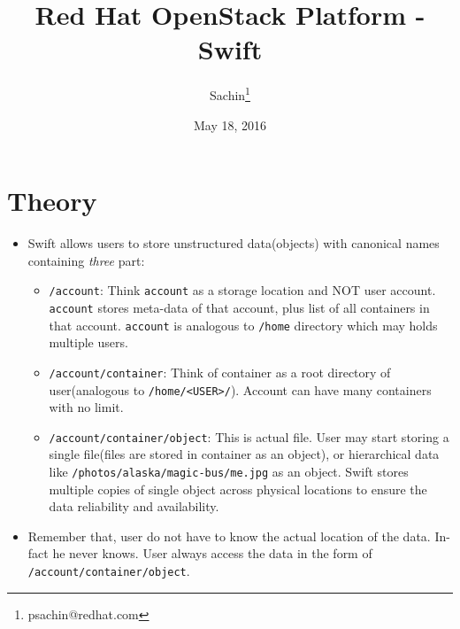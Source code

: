 \documentclass{article}
\author{Sachin\thanks{psachin@redhat.com}}
\date{May 18, 2016}
\title{Red Hat OpenStack Platform - Swift}
\begin{document}
\maketitle

\section{Theory}
\label{sec:org060d295}
\begin{itemize}
\item Swift allows users to store unstructured data(objects) with
canonical names containing \emph{three} part:
\begin{itemize}
\item \texttt{/account}: Think \texttt{account} as a storage location and NOT user
account. \texttt{account} stores meta-data of that account, plus list
of all containers in that account. \texttt{account} is analogous to
\texttt{/home} directory which may holds multiple users.

\item \texttt{/account/container}: Think of container as a root directory
of user(analogous to \texttt{/home/<USER>/}). Account can have many
containers with no limit.

\item \texttt{/account/container/object}: This is actual file. User may
start storing a single file(files are stored in container as
an object), or hierarchical data like \newline
\texttt{/photos/alaska/magic-bus/me.jpg} as an object. Swift stores
multiple copies of single object across physical locations to
ensure the data reliability and availability.
\end{itemize}

\item Remember that, user do not have to know the actual location of the
data. In-fact he never knows. User always access the data in the
form of \texttt{/account/container/object}.
\end{itemize}
\end{document}
